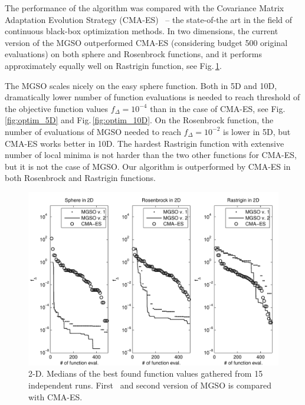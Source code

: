 \documentclass{itatnew}
\begin{document}
The performance of the algorithm was compared with the Covariance Matrix Adaptation Evolution Strategy (CMA-ES)~\cite{hansen_completely_2001} -- the state-of-the art in the field of continuous black-box optimization methods. In two dimensions, the current version of the MGSO outperformed CMA-ES (considering budget 500 original evaluations) on both sphere and Rosenbrock functions, and it performs approximately equally well on Rastrigin function, see Fig.\,\ref{fig:optim_2D}.

The MGSO scales nicely on the easy sphere function. Both in 5D and 10D, dramatically lower number of function evaluations is needed to reach threshold of the objective function values $f_{\Delta} = 10^{-4}$ than in the case of CMA-ES, see Fig.\,\ref{fig:optim_5D} and Fig.\,\ref{fig:optim_10D}. On the Rosenbrock function, the number of evaluations of MGSO needed to reach $f_{\Delta} = 10^{-2}$ is lower in 5D, but CMA-ES works better in 10D. The hardest Rastrigin function with extensive number of local minima is not harder than the two other functions for CMA-ES, but it is not the case of MGSO. Our algorithm is outperformed by CMA-ES in both Rosenbrock and Rastrigin functions.


\begin{figure}
  \centering
  \includegraphics[width=\linewidth]{optim_2D}
  {\small
    \caption{2-D. Medians of the best found function values gathered from 15 independent runs. First~\cite{bajer_model_2013} and second version of MGSO is compared with CMA-ES.
  \label{fig:optim_2D}
  }
  }
\end{figure}
\end{document}
